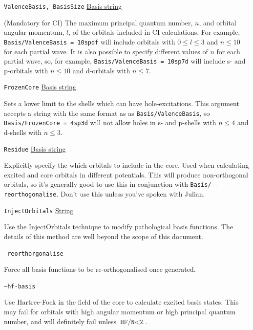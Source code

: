 \documentclass{report}
\begin{document}
\texttt{ValenceBasis, BasisSize} \uline{Basis string}
\begin{adjustwidth}{1cm}{}
(Mandatory for CI) The maximum principal quantum number, $n$, and orbital angular momentum, $l$, of
the orbitals included in CI calculations. For example, 
\texttt{Basis/ValenceBasis = 10spdf} will include orbitals with $0 \leq l \leq 3$ and $n \leq 10$ for
each partial wave. It is also possible to specify different values of $n$ for each partial wave, so, for
example, \texttt{Basis/ValenceBasis = 10sp7d} will include s- and p-orbitals with $n \leq 10$ and
d-orbitals with $n \leq 7$.
\end{adjustwidth}

\texttt{FrozenCore} \uline{Basis string}
\begin{adjustwidth}{1cm}{}
Sets a lower limit to the shells which can have hole-excitations. This argument accepts a string with
the same format as as \texttt{Basis/ValenceBasis}, so \texttt{Basis/FrozenCore = 4sp3d} will not allow 
holes in s- and p-shells with $n \leq 4$ and d-shells with $n \leq 3$.
\end{adjustwidth}

\texttt{Residue} \uline{Basis string}
\begin{adjustwidth}{1cm}{}
Explicitly specify the which orbitals to include in the core. Used when calculating excited and core
orbitals in different potentials. This will produce non-orthogonal orbitals, so it's generally good to
use this in conjunction with \texttt{Basis/{-}{-}reorthogonalise}. Don't use this unless you've spoken
with Julian.
\end{adjustwidth}

\texttt{InjectOrbitals} \uline{String}
\begin{adjustwidth}{1cm}{}
Use the InjectOrbitals technique to modify pathological basis functions. The details of this method are
well beyond the scope of this document.
\end{adjustwidth}

\texttt{--reorthorgonalise}
\begin{adjustwidth}{1cm}{}
Force all basis functions to be re-orthogonalised once generated.
\end{adjustwidth}

\texttt{--hf-basis}
\begin{adjustwidth}{1cm}{}
Use Hartree-Fock in the field of the core to calculate excited basis states. This may fail for orbitals with high angular momentum or high principal quantum number, and will definitely fail unless $\texttt{HF/N} < \texttt{Z}$.
\end{adjustwidth}
\end{document}
